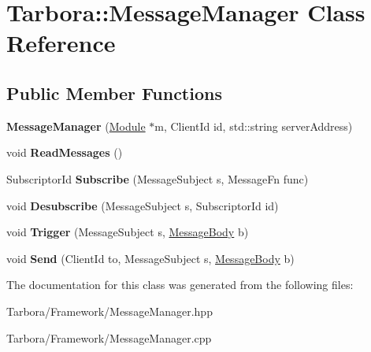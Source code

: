 \hypertarget{classTarbora_1_1MessageManager}{}\section{Tarbora\+:\+:Message\+Manager Class Reference}
\label{classTarbora_1_1MessageManager}
\subsection*{Public Member Functions}
\begin{DoxyCompactItemize}
\item 
\mbox{\label{classTarbora_1_1MessageManager_a60882d282e9f0f16bbd8e8f902c75cd7}} 
{\bfseries Message\+Manager} (\hyperlink{classTarbora_1_1Module}{Module} $\ast$m, Client\+Id id, std\+::string server\+Address)
\item 
\mbox{\label{classTarbora_1_1MessageManager_a307b77a226b9fb2789c033379f09f552}} 
void {\bfseries Read\+Messages} ()
\item 
\mbox{\label{classTarbora_1_1MessageManager_ad510bd7abdbf7acd820a97e374427c0e}} 
Subscriptor\+Id {\bfseries Subscribe} (Message\+Subject s, Message\+Fn func)
\item 
\mbox{\label{classTarbora_1_1MessageManager_a1156155d0af199887f0fde14f67b2d65}} 
void {\bfseries Desubscribe} (Message\+Subject s, Subscriptor\+Id id)
\item 
\mbox{\label{classTarbora_1_1MessageManager_a912ddfffc02c1897f5b5d140001d19bd}} 
void {\bfseries Trigger} (Message\+Subject s, \hyperlink{classTarbora_1_1MessageBody}{Message\+Body} b)
\item 
\mbox{\label{classTarbora_1_1MessageManager_a15c12212b5a1076251fa73dad955be20}} 
void {\bfseries Send} (Client\+Id to, Message\+Subject s, \hyperlink{classTarbora_1_1MessageBody}{Message\+Body} b)
\end{DoxyCompactItemize}


The documentation for this class was generated from the following files\+:\begin{DoxyCompactItemize}
\item 
Tarbora/\+Framework/Message\+Manager.\+hpp\item 
Tarbora/\+Framework/Message\+Manager.\+cpp\end{DoxyCompactItemize}
